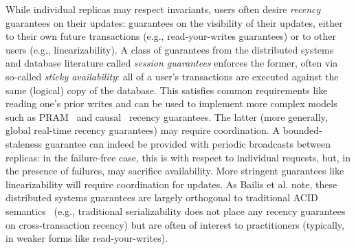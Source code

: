  While individual replicas may respect
invariants, users often desire \textit{recency} guarantees on their
updates: guarantees on the visibility of their updates, either to
their own future transactions (e.g., read-your-writes guarantees) or
to other users (e.g., linearizability). A class of guarantees from the
distributed systems and database literature called \textit{session
  guarantees} enforces the former, often via so-called \textit{sticky
  availability}: all of a user's transactions are executed against the
same (logical) copy of the database. This satisfies common
requirements like reading one's prior writes and can be used to
implement more complex models such as PRAM~\cite{pram} and
causal~\cite{lamportclocks} recency guarantees. The latter (more
generally, global real-time recency guarantees) may require
coordination. A bounded-staleness guarantee can indeed be provided
with periodic broadcasts between replicas: in the failure-free case,
this is \cfree with respect to individual requests, but, in the
presence of failures, may sacrifice availability. More stringent
guarantees like linearizability will require coordination for
updates. As Bailis et al. note, these distributed systems guarantees
are largely orthogonal to traditional ACID semantics~\cite{hat-vldb}
(e.g., traditional serializability does not place any recency
guarantees on cross-transaction recency) but are often of interest to
practitioners (typically, in weaker forms like read-your-writes).
